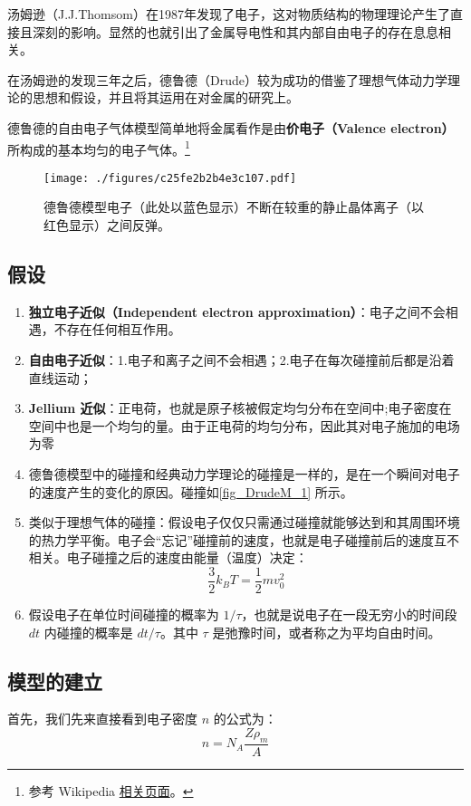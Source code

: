 
汤姆逊（J.J.Thomsom）在1987年发现了电子，这对物质结构的物理理论产生了直接且深刻的影响。显然的也就引出了金属导电性和其内部自由电子的存在息息相关。

在汤姆逊的发现三年之后，德鲁德（Drude）较为成功的借鉴了理想气体动力学理论的思想和假设，并且将其运用在对金属的研究上。

德鲁德的自由电子气体模型简单地将金属看作是由\textbf{价电子（Valence electron）}所构成的基本均匀的电子气体。\footnote{参考 Wikipedia \href{https://en.wikipedia.org/wiki/Drude_model}{相关页面}。}
\begin{figure}[ht]
\centering
\texttt{[image: ./figures/c25fe2b2b4e3c107.pdf]}
\caption{德鲁德模型电子（此处以蓝色显示）不断在较重的静止晶体离子（以红色显示）之间反弹。} \label{fig_DrudeM_1}
\end{figure}
\subsection{假设}
\begin{enumerate}
\item \textbf{独立电子近似（Independent electron approximation）}：电子之间不会相遇，不存在任何相互作用。
\item \textbf{自由电子近似}：1.电子和离子之间不会相遇；2.电子在每次碰撞前后都是沿着直线运动；
\item \textbf{Jellium 近似}：正电荷，也就是原子核被假定均匀分布在空间中;电子密度在空间中也是一个均匀的量。由于正电荷的均匀分布，因此其对电子施加的电场为零
\item 德鲁德模型中的碰撞和经典动力学理论的碰撞是一样的，是在一个瞬间对电子的速度产生的变化的原因。碰撞如\autoref{fig_DrudeM_1} 所示。
\item 类似于理想气体的碰撞：假设电子仅仅只需通过碰撞就能够达到和其周围环境的热力学平衡。电子会“忘记”碰撞前的速度，也就是电子碰撞前后的速度互不相关。电子碰撞之后的速度由能量（温度）决定：
\begin{equation}\label{eq_DrudeM_7}
\frac{3}{2}k_BT = \frac{1}{2}mv_0^2
\end{equation}
\item 假设电子在单位时间碰撞的概率为 $1/\tau $，也就是说电子在一段无穷小的时间段 $dt$ 内碰撞的概率是 $dt/\tau$。其中 $\tau$ 是弛豫时间，或者称之为平均自由时间。
\end{enumerate}
\subsection{模型的建立}
首先，我们先来直接看到电子密度 $n$ 的公式为：
\begin{equation}
n=N_A\frac{Z\rho_m}{A}
\end{equation}

